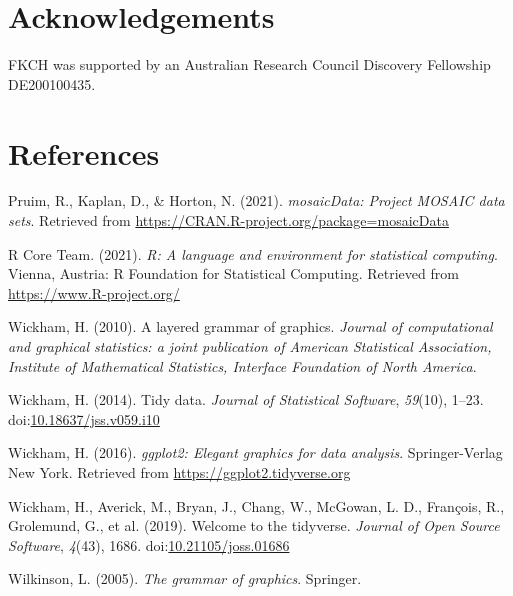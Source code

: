 \documentclass[10pt,a4paper,onecolumn]{article}
\newlength{\cslhangindent}
\newlength{\cslentryspacingunit} %
\newenvironment{CSLReferences}[2] %
 {%
  \setlength{\parindent}{0pt}
  \ifodd #1
  \let\oldpar\par
  \def\par{\hangindent=\cslhangindent\oldpar}
  \fi
  \setlength{\parskip}{#2\cslentryspacingunit}
 }%
 {}
\begin{document}
\hypertarget{acknowledgements}{%
\section{Acknowledgements}\label{acknowledgements}}

FKCH was supported by an Australian Research Council Discovery
Fellowship DE200100435.

\hypertarget{references}{%
\section*{References}\label{references}}

\hypertarget{refs}{}
\begin{CSLReferences}{1}{0}
\leavevmode\hypertarget{ref-mosaicData}{}%
Pruim, R., Kaplan, D., \& Horton, N. (2021). \emph{mosaicData: Project
MOSAIC data sets}. Retrieved from
\url{https://CRAN.R-project.org/package=mosaicData}

\leavevmode\hypertarget{ref-rstats}{}%
R Core Team. (2021). \emph{R: A language and environment for statistical
computing}. Vienna, Austria: R Foundation for Statistical Computing.
Retrieved from \url{https://www.R-project.org/}

\leavevmode\hypertarget{ref-Wickham2010-kt}{}%
Wickham, H. (2010). A layered grammar of graphics. \emph{Journal of
computational and graphical statistics: a joint publication of American
Statistical Association, Institute of Mathematical Statistics, Interface
Foundation of North America}.

\leavevmode\hypertarget{ref-Wickham2014-gy}{}%
Wickham, H. (2014). Tidy data. \emph{Journal of Statistical Software},
\emph{59}(10), 1--23.
doi:\href{https://doi.org/10.18637/jss.v059.i10}{10.18637/jss.v059.i10}

\leavevmode\hypertarget{ref-Wickham2016}{}%
Wickham, H. (2016). \emph{ggplot2: Elegant graphics for data analysis}.
Springer-Verlag New York. Retrieved from
\url{https://ggplot2.tidyverse.org}

\leavevmode\hypertarget{ref-Wickham2019}{}%
Wickham, H., Averick, M., Bryan, J., Chang, W., McGowan, L. D.,
François, R., Grolemund, G., et al. (2019). Welcome to the {tidyverse}.
\emph{Journal of Open Source Software}, \emph{4}(43), 1686.
doi:\href{https://doi.org/10.21105/joss.01686}{10.21105/joss.01686}

\leavevmode\hypertarget{ref-Wilkinson2005-oz}{}%
Wilkinson, L. (2005). \emph{The grammar of graphics}. Springer.

\end{CSLReferences}
\end{document}
